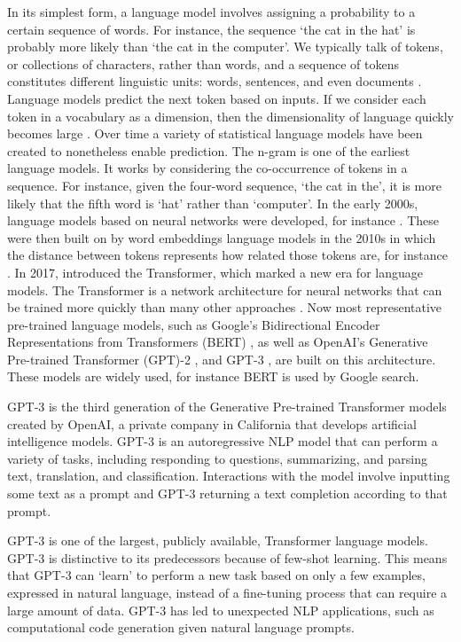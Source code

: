 \documentclass[12pt,]{article}
\begin{document}
In its simplest form, a language model involves assigning a probability to a certain sequence of words. For instance, the sequence `the cat in the hat' is probably more likely than `the cat in the computer'. We typically talk of tokens, or collections of characters, rather than words, and a sequence of tokens constitutes different linguistic units: words, sentences, and even documents \citep{bengio2003neural}. Language models predict the next token based on inputs. If we consider each token in a vocabulary as a dimension, then the dimensionality of language quickly becomes large \citep{rosenfeld2000two}. Over time a variety of statistical language models have been created to nonetheless enable prediction. The n-gram is one of the earliest language models. It works by considering the co-occurrence of tokens in a sequence. For instance, given the four-word sequence, `the cat in the', it is more likely that the fifth word is `hat' rather than `computer'. In the early 2000s, language models based on neural networks were developed, for instance \citet{bengio2003neural}. These were then built on by word embeddings language models in the 2010s in which the distance between tokens represents how related those tokens are, for instance \citet{turian2010word}. In 2017, \citet{vaswani2017attention} introduced the Transformer, which marked a new era for language models. The Transformer is a network architecture for neural networks that can be trained more quickly than many other approaches \citep{vaswani2017attention}. Now most representative pre-trained language models, such as Google's Bidirectional Encoder Representations from Transformers (BERT) \citep{devlin2018bert}, as well as OpenAI's Generative Pre-trained Transformer (GPT)-2 \citep{radford2019language}, and GPT-3 \citep{brown2020language}, are built on this architecture. These models are widely used, for instance BERT is used by Google search.

GPT-3 is the third generation of the Generative Pre-trained Transformer models created by OpenAI, a private company in California that develops artificial intelligence models. GPT-3 is an autoregressive NLP model that can perform a variety of tasks, including responding to questions, summarizing, and parsing text, translation, and classification. Interactions with the model involve inputting some text as a prompt and GPT-3 returning a text completion according to that prompt.

GPT-3 is one of the largest, publicly available, Transformer language models. GPT-3 is distinctive to its predecessors because of few-shot learning. This means that GPT-3 can `learn' to perform a new task based on only a few examples, expressed in natural language, instead of a fine-tuning process that can require a large amount of data. GPT-3 has led to unexpected NLP applications, such as computational code generation given natural language prompts.
\end{document}
